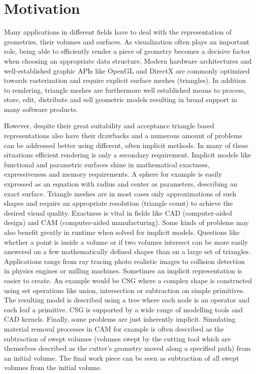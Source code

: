 
 
\section{Motivation}

Many applications in different fields have to deal with the representation of geometries, their volumes and surfaces. As visualization often plays an important role, being able to efficiently render a piece of geometry becomes a decisive factor when choosing an appropriate data structure. Modern hardware architectures and well-established graphic APIs like OpenGL and DirectX are commonly optimized towards rasterization and require explicit surface meshes (\ie triangles). In addition to rendering, triangle meshes are furthermore well established means to process, store, edit, distribute and sell geometric models resulting in broad support in many software products.

However, despite their great suitability and acceptance triangle based representations also have their drawbacks and a numerous amount of problems can be addressed better using different, often implicit methods. In many of these situations efficient rendering is only a secondary requirement. Implicit models like functional and parametric surfaces shine in mathematical exactness, expressiveness and memory requirements. A sphere for example is easily expressed as an equation with radius and center as parameters, describing an exact surface. Triangle meshes are in most cases only approximations of such shapes and require an appropriate resolution (\ie triangle count) to achieve the desired visual quality. Exactness is vital in fields like CAD (computer-aided design) and CAM (computer-aided manufacturing).
Some kinds of problems may also benefit greatly in runtime when solved for implicit models. Questions like whether a point is inside a volume or if two volumes intersect can be more easily answered on a few mathematically defined shapes than on a large set of triangles. Applications range from ray tracing photo realistic images to collision detection in physics engines or milling machines. 
Sometimes an implicit representation is easier to create. An example would be CSG where a complex shape is constructed using set operations like union, intersection or subtraction on simple primitives. The resulting model is described using a tree where each node is an operator and each leaf a primitive. CSG is supported by a wide range of modelling tools and CAD kernels.
Finally, some problems are just inherently implicit. Simulating material removal processes in CAM for example is often described as the subtraction of swept volumes (volumes swept by the cutting tool which are themselves described as the cutter's geometry moved along a specified path) from an initial volume. The final work piece can be seen as subtraction of all swept volumes from the initial volume.

